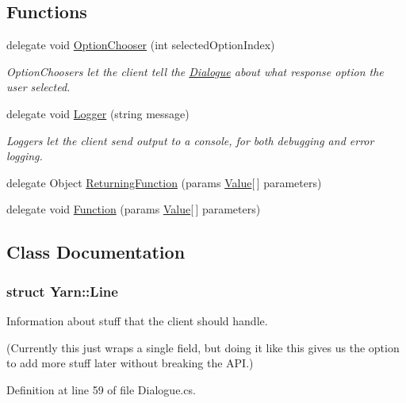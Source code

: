 \subsection*{Functions}
\begin{DoxyCompactItemize}
\item 
delegate void \hyperlink{a00053_a39866cbb03c03a35805d598b5d4ad553}{Option\-Chooser} (int selected\-Option\-Index)
\begin{DoxyCompactList}\small\item\em Option\-Choosers let the client tell the \hyperlink{a00094}{Dialogue} about what response option the user selected. \end{DoxyCompactList}\item 
delegate void \hyperlink{a00053_a1e50031b945a3a2afafee6f590730568}{Logger} (string message)
\begin{DoxyCompactList}\small\item\em Loggers let the client send output to a console, for both debugging and error logging. \end{DoxyCompactList}\item 
delegate Object \hyperlink{a00053_a5177bf74fbfe7303fac9d8236c2e514b}{Returning\-Function} (params \hyperlink{a00189}{Value}\mbox{[}$\,$\mbox{]} parameters)
\item 
delegate void \hyperlink{a00053_ae0be2e5cf13d5779816102439e61ff1a}{Function} (params \hyperlink{a00189}{Value}\mbox{[}$\,$\mbox{]} parameters)
\end{DoxyCompactItemize}


\subsection{Class Documentation}
\label{a00380}
\hypertarget{a00053_a00380}{}
\subsubsection{struct Yarn\-:\-:Line}
Information about stuff that the client should handle. 

(Currently this just wraps a single field, but doing it like this gives us the option to add more stuff later without breaking the A\-P\-I.) 

Definition at line 59 of file Dialogue.\-cs.



